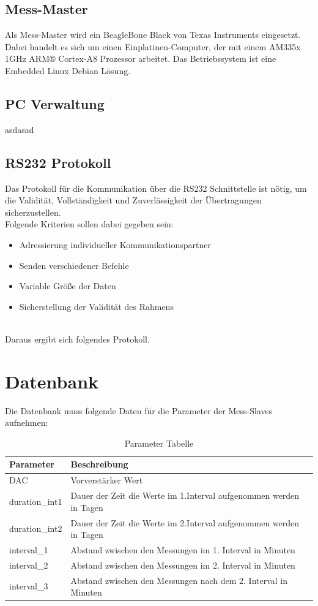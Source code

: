 \subsection{Mess-Master}
\label{section_Mess-Master}

Als Mess-Master wird ein BeagleBone Black von Texas Instruments eingesetzt. Dabei handelt es sich um einen Einplatinen-Computer, der mit einem AM335x 1GHz ARM® Cortex-A8 Prozessor arbeitet. Das Betriebssystem ist eine Embedded Linux Debian Lösung.


\subsection{PC Verwaltung}
\label{section_Verwaltung}
asdasad


\subsection{RS232 Protokoll}
\label{section_RS232_Protokoll}
Das Protokoll für die Kommunikation über die RS232 Schnittstelle ist nötig, um die Validität, Vollständigkeit und Zuverlässigkeit der Übertragungen sicherzustellen.\ \\

Folgende Kriterien sollen dabei gegeben sein:
\begin{itemize}
\item Adressierung individueller Kommunikationspartner
\item Senden verschiedener Befehle
\item Variable Größe der Daten
\item Sicherstellung der Validität des Rahmens
\end{itemize}
\ \\
Daraus ergibt sich folgendes Protokoll.

\section{Datenbank}
\label{section_EntwurfDatenbank}

Die Datenbank muss folgende Daten für die Parameter der Mess-Slaves aufnehmen:\\

\begin{table}[h]
\centering
\begin{tabular}{|l|l|}\hline
Parameter & Beschreibung \\ \hline
DAC & Vorverstärker Wert\\ 
duration\_int1 & Dauer der Zeit die Werte im 1.Interval aufgenommen werden in Tagen\\ 
duration\_int2 & Dauer der Zeit die Werte im 2.Interval aufgenommen werden in Tagen\\ 
interval\_1 & Abstand zwischen den Messungen im 1. Interval in Minuten\\ 
interval\_2 & Abstand zwischen den Messungen im 2. Interval in Minuten\\ 
interval\_3 & Abstand zwischen den Messungen nach dem 2. Interval in Minuten\\ \hline
\end{tabular}
\caption{Parameter Tabelle}
\label{table_Parameter}
\end{table}

